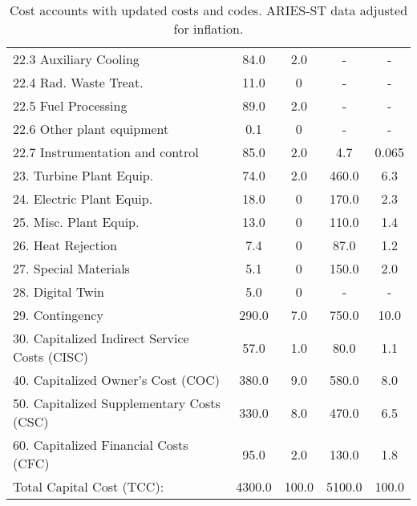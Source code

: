 \begin{table}[h!]
{\begin{tabular}{lcccc}
\hspace{10mm}22.3 Auxiliary Cooling & 84.0 & 2.0 & - & - \\
\hspace{10mm}22.4 Rad. Waste Treat. & 11.0 & 0 & - & - \\
\hspace{10mm}22.5 Fuel Processing & 89.0 & 2.0 & - & - \\
\hspace{10mm}22.6 Other plant equipment & 0.1 & 0 & - & - \\
\hspace{10mm}22.7 Instrumentation and control & 85.0 & 2.0 & 4.7 & 0.065 \\
\hspace{5mm}23. Turbine Plant Equip. & 74.0 & 2.0 & 460.0 & 6.3 \\
\hspace{5mm}24. Electric Plant Equip. & 18.0 & 0 & 170.0 & 2.3 \\
\hspace{5mm}25. Misc. Plant Equip. & 13.0 & 0 & 110.0 & 1.4 \\
\hspace{5mm}26. Heat Rejection & 7.4 & 0 & 87.0 & 1.2 \\
\hspace{5mm}27. Special Materials & 5.1 & 0 & 150.0 & 2.0 \\
\hspace{5mm}28. Digital Twin & 5.0 & 0 & - & - \\
\hspace{5mm}29. Contingency & 290.0 & 7.0 & 750.0 & 10.0 \\
30. Capitalized Indirect Service Costs (CISC) & 57.0 & 1.0 & 80.0 & 1.1 \\
40. Capitalized Owner’s Cost (COC) & 380.0 & 9.0 & 580.0 & 8.0 \\
50. Capitalized Supplementary Costs (CSC) & 330.0 & 8.0 & 470.0 & 6.5 \\
60. Capitalized Financial Costs (CFC) & 95.0 & 2.0 & 130.0 & 1.8 \\
\hline
Total Capital Cost (TCC): & 4300.0 & 100.0 & 5100.0 & 100.0 \\
\hline
\end{tabular}
}
\caption{Cost accounts with updated costs and codes. ARIES-ST data adjusted for inflation.}
\label{tab:costs_updated_codes}
\end{table}


